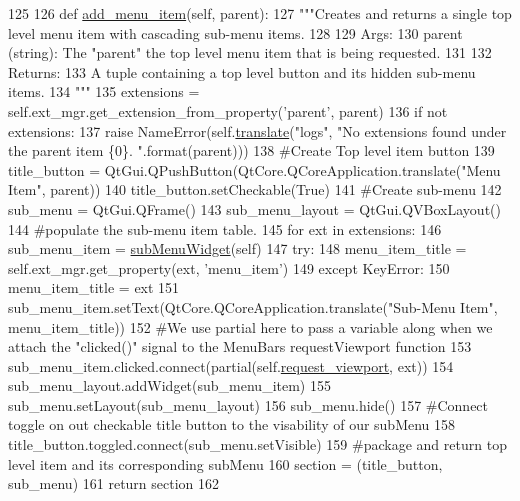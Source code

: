 \begin{DoxyCode}
125 
126     \textcolor{keyword}{def }\hyperlink{classcommotion__client_1_1GUI_1_1menu__bar_1_1MenuBar_a7bbc3f3ab719dadb7943780dd17f1e82}{add\_menu\_item}(self, parent):
127         \textcolor{stringliteral}{"""Creates and returns a single top level menu item with cascading sub-menu items.}
128 \textcolor{stringliteral}{                }
129 \textcolor{stringliteral}{        Args:}
130 \textcolor{stringliteral}{        parent (string): The "parent" the top level menu item that is being requested.}
131 \textcolor{stringliteral}{        }
132 \textcolor{stringliteral}{        Returns:}
133 \textcolor{stringliteral}{        A tuple containing a top level button and its hidden sub-menu items.        }
134 \textcolor{stringliteral}{        """}
135         extensions = self.ext\_mgr.get\_extension\_from\_property(\textcolor{stringliteral}{'parent'}, parent)
136         \textcolor{keywordflow}{if} \textcolor{keywordflow}{not} extensions:
137             \textcolor{keywordflow}{raise} NameError(self.\hyperlink{classcommotion__client_1_1GUI_1_1menu__bar_1_1MenuBar_ad97dbe989a68d0453584c7c95137b8b4}{translate}(\textcolor{stringliteral}{"logs"}, \textcolor{stringliteral}{"No extensions found under the parent item \{0\}.
      "}.format(parent)))
138         \textcolor{comment}{#Create Top level item button}
139         title\_button = QtGui.QPushButton(QtCore.QCoreApplication.translate(\textcolor{stringliteral}{"Menu Item"}, parent))
140         title\_button.setCheckable(\textcolor{keyword}{True})
141         \textcolor{comment}{#Create sub-menu}
142         sub\_menu = QtGui.QFrame()
143         sub\_menu\_layout = QtGui.QVBoxLayout()
144         \textcolor{comment}{#populate the sub-menu item table.}
145         \textcolor{keywordflow}{for} ext \textcolor{keywordflow}{in} extensions:
146             sub\_menu\_item = \hyperlink{classcommotion__client_1_1GUI_1_1menu__bar_1_1subMenuWidget}{subMenuWidget}(self)
147             \textcolor{keywordflow}{try}:
148                 menu\_item\_title = self.ext\_mgr.get\_property(ext, \textcolor{stringliteral}{'menu\_item'})
149             \textcolor{keywordflow}{except} KeyError:
150                 menu\_item\_title = ext
151             sub\_menu\_item.setText(QtCore.QCoreApplication.translate(\textcolor{stringliteral}{"Sub-Menu Item"}, menu\_item\_title))
152             \textcolor{comment}{#We use partial here to pass a variable along when we attach the "clicked()" signal to the
       MenuBars requestViewport function}
153             sub\_menu\_item.clicked.connect(partial(self.\hyperlink{classcommotion__client_1_1GUI_1_1menu__bar_1_1MenuBar_af0829b0f4a27a6246efbbe8c4412a283}{request\_viewport}, ext))
154             sub\_menu\_layout.addWidget(sub\_menu\_item)
155         sub\_menu.setLayout(sub\_menu\_layout)
156         sub\_menu.hide()
157         \textcolor{comment}{#Connect toggle on out checkable title button to the visability of our subMenu}
158         title\_button.toggled.connect(sub\_menu.setVisible)
159         \textcolor{comment}{#package and return top level item and its corresponding subMenu}
160         section = (title\_button, sub\_menu)
161         \textcolor{keywordflow}{return} section
162 

\end{DoxyCode}
